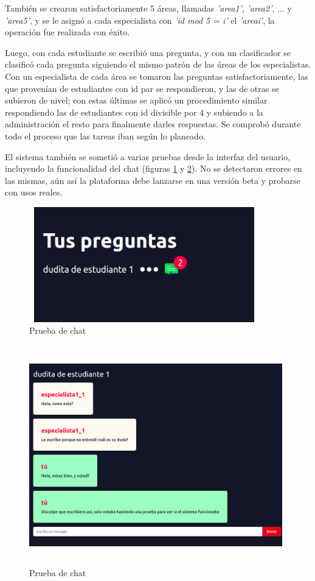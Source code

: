 También se crearon satisfactoriamente 5 áreas, llamadas \textit{'area1'}, \textit{'area2'}, ... y \textit{'area5'}, y se le asignó a cada especialista con \textit{'id mod 5 = i'} el \textit{'areai'}, la operación fue realizada con éxito.
\newline

Luego, con cada estudiante se escribió una pregunta, y con un clasificador se clasificó cada pregunta siguiendo el mismo patrón de las áreas de los especialistas. Con un especialista de cada área se tomaron las preguntas satisfactoriamente, las que provenían de estudiantes con id par se respondieron, y las de otras se subieron de nivel; con estas últimas se aplicó un procedimiento similar respondiendo las de estudiantes con id divisible por 4 y subiendo a la administración el resto para finalmente darles respuestas. Se comprobó durante todo el proceso que las tareas iban según lo planeado.
\newline

El sistema también se sometió a varias pruebas desde la interfaz del usuario, incluyendo la funcionalidad del chat (figuras \ref{fig:chat1} y \ref{fig:chat2}). No se detectaron errores en las mismas, aún así la plataforma debe lanzarse en una versión beta y probarse con usos reales.

\begin{figure}[h]
	\begin{center}
		\includegraphics[width=10cm, height=5cm]{chat_test1.png}
		\caption{Prueba de chat}
		\label{fig:chat1}
	\end{center}
	
\end{figure}

\begin{figure}[h]
	\begin{center}
		\includegraphics[width=11cm, height=9.5cm]{chat_test2.png}
		\caption{Prueba de chat}
		\label{fig:chat2}
	\end{center}
	
\end{figure}